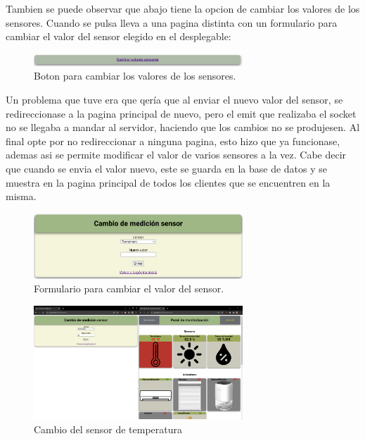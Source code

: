 \documentclass{article}
\begin{document}
Tambien se puede observar que abajo tiene la opcion de cambiar los valores de los sensores. Cuando se pulsa lleva a una pagina distinta con un formulario para cambiar el valor del sensor elegido en el desplegable:

\begin{figure}[H]
    \centering
    \includegraphics[width=0.7\textwidth]{images/cambiarsensor.png}
    \caption{Boton para cambiar los valores de los sensores.}
\end{figure}

Un problema que tuve era que qería que al enviar el nuevo valor del sensor, se redireccionase a la pagina principal de nuevo, pero el emit que realizaba el socket no se llegaba a mandar al servidor, haciendo que los cambios no se produjesen. Al final opte por no redireccionar a ninguna pagina, esto hizo que ya funcionase, ademas asi se permite modificar el valor de varios sensores a la vez. Cabe decir que cuando se envia el valor nuevo, este se guarda en la base de datos y se muestra en la pagina principal de todos los clientes que se encuentren en la misma.

\begin{figure}[H]
    \centering
    \includegraphics[width=0.7\textwidth]{images/form.png}
    \caption{Formulario para cambiar el valor del sensor.}
\end{figure}

\begin{figure}[H]
    \centering
    \includegraphics[width=0.7\textwidth]{images/cambiotemp.png}
    \caption{Cambio del sensor de temperatura}
\end{figure}
\end{document}
